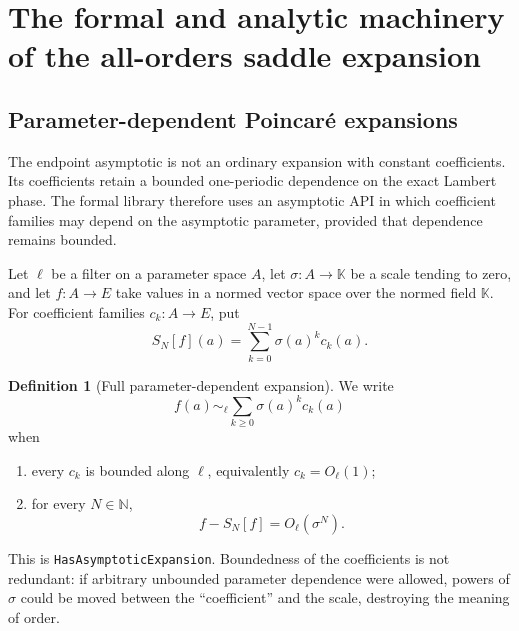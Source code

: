 \documentclass[11pt,oneside]{article}
\theoremstyle{definition}
\newtheorem{definition}[definition]{Definition}
\theoremstyle{remark}
\newcommand{\N}{\mathbb N}
\newcommand{\lean}[1]{%
  \ifmmode\text{\texttt{\detokenize{#1}}}\else\nolinkurl{#1}\fi}
\begin{document}
\section{The formal and analytic machinery of the all-orders saddle expansion}

\subsection{Parameter-dependent Poincar\'e expansions}
\label{integration:sec:poincare-api}

The endpoint asymptotic is not an ordinary expansion with constant coefficients.  Its
coefficients retain a bounded one-periodic dependence on the exact Lambert phase.  The
formal library therefore uses an asymptotic API in which coefficient families may depend on
the asymptotic parameter, provided that dependence remains bounded.

Let $\ell$ be a filter on a parameter space $A$, let $\sigma:A\to\mathbb K$ be a scale tending
to zero, and let $f:A\to E$ take values in a normed vector space over the normed field
$\mathbb K$.  For coefficient families $c_k:A\to E$, put
\begin{equation}
 S_N[f](a)=\sum_{k=0}^{N-1}\sigma(a)^k c_k(a).
 \label{integration:eq:parameter-partial-sum}
\end{equation}

\begin{definition}[Full parameter-dependent expansion]
\label{integration:def:parameter-expansion}
We write
\begin{equation}
 f(a)\sim_{\ell}\sum_{k\ge0}\sigma(a)^kc_k(a)
 \label{integration:eq:parameter-expansion-symbol}
\end{equation}
when
\begin{enumerate}
 \item every $c_k$ is bounded along $\ell$, equivalently $c_k=O_{\ell}(1)$;
 \item for every $N\in\N$,
 \begin{equation}
  f-S_N[f]=O_{\ell}(\sigma^N).
  \label{integration:eq:parameter-expansion-remainder}
 \end{equation}
\end{enumerate}
\end{definition}

This is \lean{HasAsymptoticExpansion}.  Boundedness of the coefficients is not redundant: if
arbitrary unbounded parameter dependence were allowed, powers of $\sigma$ could be moved
between the ``coefficient'' and the scale, destroying the meaning of order.
\end{document}
